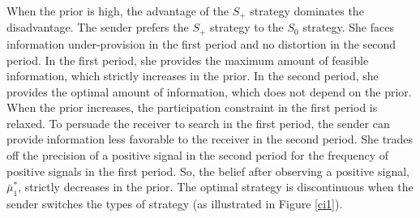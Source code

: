 \documentclass[11pt]{extarticle}
\begin{document}
When the prior is high, the advantage of the $S_+$ strategy dominates the disadvantage. The sender prefers the $S_+$ strategy to the $S_0$ strategy. She faces information under-provision in the first period and no distortion in the second period. In the first period, she provides the maximum amount of feasible information, which strictly increases in the prior. In the second period, she provides the optimal amount of information, which does not depend on the prior. When the prior increases, the participation constraint in the first period is relaxed. To persuade the receiver to search in the first period, the sender can provide information less favorable to the receiver in the second period. She trades off the precision of a positive signal in the second period for the frequency of positive signals in the first period. So, the belief after observing a positive signal, $\bar{\mu}_1^*$, strictly decreases in the prior. The optimal strategy is discontinuous when the sender switches the types of strategy (as illustrated in Figure \ref{ci1}).
\end{document}
